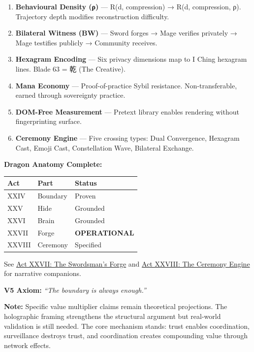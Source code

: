 \documentclass[
]{article}
\newcounter{none} %
\begin{document}
\begin{enumerate}
\def\labelenumi{\arabic{enumi}.}
\item
  \textbf{Behavioural Density (ρ)} --- R(d, compression) → R(d,
  compression, ρ). Trajectory depth modifies reconstruction difficulty.
\item
  \textbf{Bilateral Witness (BW)} --- Sword forges → Mage verifies
  privately → Mage testifies publicly → Community receives.
\item
  \textbf{Hexagram Encoding} --- Six privacy dimensions map to I Ching
  hexagram lines. Blade 63 = 乾 (The Creative).
\item
  \textbf{Mana Economy} --- Proof-of-practice Sybil resistance.
  Non-transferable, earned through sovereignty practice.
\item
  \textbf{DOM-Free Measurement} --- Pretext library enables rendering
  without fingerprinting surface.
\item
  \textbf{Ceremony Engine} --- Five crossing types: Dual Convergence,
  Hexagram Cast, Emoji Cast, Constellation Wave, Bilateral Exchange.
\end{enumerate}

\textbf{Dragon Anatomy Complete:}

{\def\LTcaptype{none} %
\begin{longtable}[]{@{}lll@{}}
\toprule\noalign{}
Act & Part & Status \\
\midrule\noalign{}
\endhead
\bottomrule\noalign{}
\endlastfoot
XXIV & Boundary & Proven \\
XXV & Hide & Grounded \\
XXVI & Brain & Grounded \\
XXVII & Forge & \textbf{OPERATIONAL} \\
XXVIII & Ceremony & Specified \\
\end{longtable}
}

See \href{archive/act-xxvii-the-swordsmans-forge.md}{Act XXVII: The
Swordsman's Forge} and
\href{archive/act-xxviii-the-ceremony-engine.md}{Act XXVIII: The
Ceremony Engine} for narrative companions.

\textbf{V5 Axiom:} \emph{``The boundary is always enough.''}

\textbf{Note:} Specific value multiplier claims remain theoretical
projections. The holographic framing strengthens the structural argument
but real-world validation is still needed. The core mechanism stands:
trust enables coordination, surveillance destroys trust, and
coordination creates compounding value through network effects.
\end{document}
